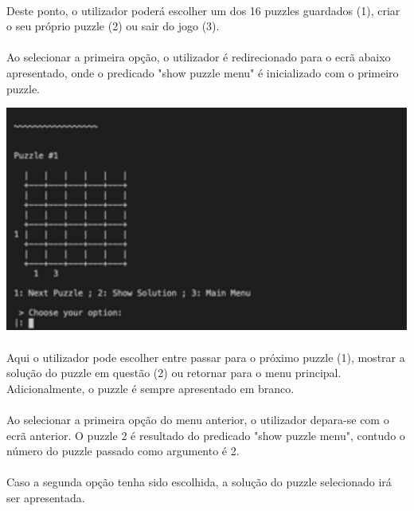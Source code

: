 \documentclass[a4paper]{article}
\begin{document}
\paragraph{}
Deste ponto, o utilizador poderá escolher um dos 16 puzzles guardados (1), criar o seu próprio puzzle (2) ou sair do jogo (3).

\paragraph{}
Ao selecionar a primeira opção, o utilizador é redirecionado para o ecrã abaixo apresentado, onde o predicado "show puzzle menu" é inicializado com o primeiro puzzle.

\begin{center}
    \includegraphics[scale=0.4]{img/3.png}
\end{center}

\paragraph{}
Aqui o utilizador pode escolher entre passar para o próximo puzzle (1), mostrar a solução do puzzle em questão (2) ou retornar para o menu principal.
Adicionalmente, o puzzle é sempre apresentado em branco.
 
\paragraph{}
Ao selecionar a primeira opção do menu anterior, o utilizador depara-se com o ecrã anterior. O puzzle 2 é resultado do predicado "show puzzle menu", contudo o número do puzzle passado como argumento é 2.

\paragraph{} 
Caso a segunda opção tenha sido escolhida, a solução do puzzle selecionado irá ser apresentada.
\end{document}
